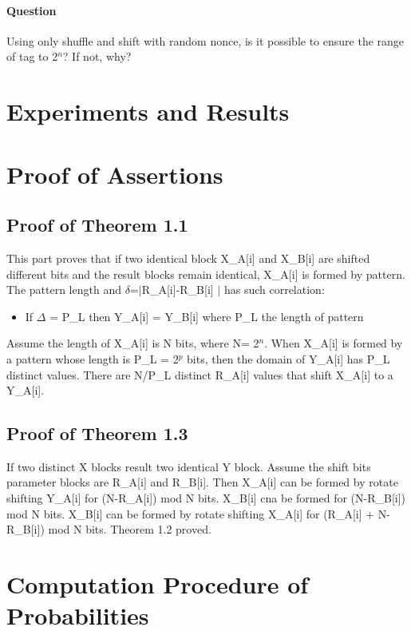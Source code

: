 \documentclass{article}
\begin{document}
\paragraph{Question}
Using only shuffle and shift with random nonce, is it possible to ensure the range of tag to 2$^n$? If not, why?

\section{Experiments and Results}

\appendix
\section{Proof of Assertions}
\subsection{Proof of Theorem 1.1}
This part proves that if two identical block X\_A[i]  and X\_B[i] are shifted different bits and the result blocks remain identical, X\_A[i] is formed by pattern. The pattern length and $\delta$=$\mid$R\_A[i]-R\_B[i] $\mid$ has such correlation:
\begin{itemize}
	\item If $\Delta$ = P\_L then Y\_A[i] = Y\_B[i] where P\_L the length of pattern
\end{itemize}
Assume the length of X\_A[i] is N bits, where N= 2$^n$. When X\_A[i] is formed by a pattern whose length is P\_L = 2$^p$ bits, then the domain of Y\_A[i] has P\_L distinct values. There are N/P\_L distinct R\_A[i] values that shift X\_A[i] to a Y\_A[i].  

\subsection{Proof of Theorem 1.3}
If two distinct X blocks result two identical Y block. Assume the shift bits parameter blocks are R\_A[i] and R\_B[i]. Then X\_A[i] can be formed by rotate shifting Y\_A[i] for (N-R\_A[i]) mod N bits. X\_B[i] cna be formed for (N-R\_B[i]) mod N bits.
X\_B[i] can be formed by rotate shifting X\_A[i] for (R\_A[i] + N-R\_B[i]) mod N bits. Theorem 1.2 proved.

\section{Computation Procedure of Probabilities}
\end{document}
